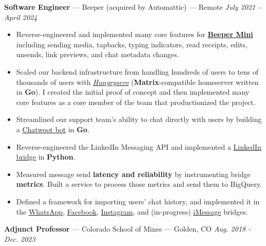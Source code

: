 \documentclass[10pt,letterpaper]{article}
\begin{document}
{\fontsize{11}{0}
\textbf{Software Engineer} --- Beeper (acquired by Automattic) --- Remote}
\hfill \textit{July 2021 - April 2024}
\begin{itemize}
    \item Reverse-engineered and implemented many core features for
        \href{https://blog.beeper.com/p/introducing-beeper-mini-get-blue}{\textbf{Beeper Mini}}
        including sending media, tapbacks, typing indicators, read receipts,
        edits, unsends, link previews, and chat metadata changes.
    \item Scaled our backend infrastructure from handling hundreds of users to
        tens of thousands of users with
        \href{https://github.com/sumnerevans/hungryserv-presentation}{\textit{Hungryserv}}
        (\textbf{Matrix}-compatible homeserver written in \textbf{Go}).
        I created the initial proof of concept and then implemented many core
        features as a core member of the team that productionized the project.
    \item Streamlined our support team's ability to chat directly with users by
        building a
        \href{https://github.com/beeper/chatwoot}{Chatwoot bot} in
        \textbf{Go}.
    \item Reverse-engineered the LinkedIn Messaging API and implemented a
        \href{https://github.com/beeper/linkedin}{LinkedIn bridge} in
        \textbf{Python}.
    \item Measured message send \textbf{latency and reliability} by
        instrumenting bridge \textbf{metrics}. Built a service to process those
        metrics and send them to BigQuery.
    \item Defined a framework for importing users' chat history, and
        implemented it in the
        \href{https://github.com/mautrix/whatsapp}{WhatsApp},
        \href{https://github.com/mautrix/facebook}{Facebook},
        \href{https://github.com/mautrix/instagram}{Instagram}, and
        (in-progress) \href{https://github.com/mautrix/imessage}{iMessage} bridges.
\end{itemize}

{\fontsize{11}{0}
\textbf{Adjunct Professor} --- Colorado School of Mines --- Golden, CO}
\hfill \textit{Aug. 2018 - Dec. 2023}
\end{document}
